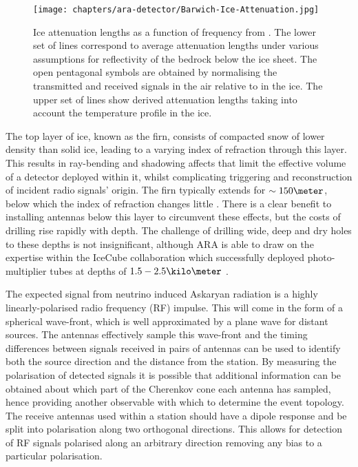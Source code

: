 \begin{figure}[htpb]
  \texttt{[image: chapters/ara-detector/Barwich-Ice-Attenuation.jpg]}
  \caption{Ice attenuation lengths as a function of frequency from \cite{Barwick:2005-03-01T00:00:00:0022-1430:231}. The lower set of lines correspond to average attenuation lengths under various assumptions for reflectivity of the bedrock below the ice sheet. The open pentagonal symbols are obtained by normalising the transmitted and received signals in the air relative to in the ice. The upper set of lines show derived attenuation lengths taking into account the temperature profile in the ice.}
  \label{fig:ara-detector:Ice-Attenuation}
\end{figure}

The top layer of ice, known as the firn, consists of compacted snow of lower density than solid ice,  leading to a varying index of refraction through this layer. This results in ray-bending and shadowing affects that limit the effective volume of a detector deployed within it, whilst complicating triggering and reconstruction of incident radio signals' origin. The firn typically extends for $\sim 150 \meter$, below which the index of refraction changes little \cite{2004JGlac..50..522K}. There is a clear benefit to installing antennas below this layer to circumvent these effects, but the costs of drilling rise rapidly with depth. The challenge of drilling wide, deep and dry holes to these depths is not insignificant, although ARA is able to draw on the expertise within the IceCube collaboration which successfully deployed photo-multiplier tubes at depths of $1.5 - 2.5 \kilo \meter$ \cite{2010RScI...81h1101H}.


The expected signal from neutrino induced Askaryan radiation is a highly linearly-polarised radio frequency (RF) impulse. This will come in the form of a spherical wave-front, which is well approximated by a plane wave for distant sources. The antennas effectively sample this wave-front and the timing differences between signals received in pairs of antennas can be used to identify both the source direction and the distance from the station. By measuring the polarisation of detected signals it is possible that additional information can be obtained about which part of the Cherenkov cone each antenna has sampled, hence providing another observable with which to determine the event topology. The receive antennas used within a station should have a dipole response and be split into polarisation along two orthogonal directions. This allows for detection of RF signals polarised along an arbitrary direction removing any bias to a particular polarisation.

